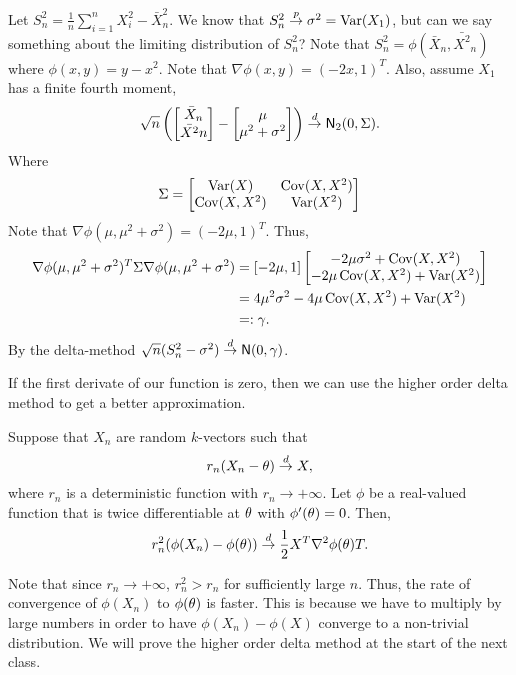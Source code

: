 \begin{example}
    Let $S_n^2 = \frac{1}{n}\sum_{i=1}^n X_i^2 - \bar{X}_n^2$. We know that $S_n^2 \stackrel{p}{\to} \sigma^2 = \operatorname{Var}(X_1)$, but can we say something about the limiting distribution of $S_n^2$? Note that $S_n^2 = \phi(\bar{X}_n, \bar{X^2}_n)$ where $\phi(x,y) = y-x^2$. Note that $\nabla \phi(x,y) = (-2x,1)^T$. Also, assume $X_1$ has a finite fourth moment,
    \[\sqrt{n}\left(\begin{bmatrix}
        \bar{X}_n\\\bar{X^2}{n}
    \end{bmatrix} - \begin{bmatrix}
        \mu \\ \mu^2+\sigma^2
    \end{bmatrix}\right)\stackrel{d}{\to} \mathsf{N}_2(0,\Sigma). \]
    Where 
    \[\Sigma = \begin{bmatrix}
        \operatorname{Var}(X)& \operatorname{Cov}(X,X^2)\\ \operatorname{Cov}(X,X^2)&\operatorname{Var}(X^2)
    \end{bmatrix} \]
    Note that $\nabla \phi(\mu,\mu^2+\sigma^2) = (-2\mu,1)^T$. Thus,
    \begin{align*}
        \nabla \phi(\mu,\mu^2+\sigma^2)^T\Sigma \nabla \phi(\mu,\mu^2+\sigma^2) &= [-2\mu,1]\begin{bmatrix}
        -2\mu\sigma^2+\operatorname{Cov}(X,X^2)\\
        -2\mu\operatorname{Cov}(X,X^2)+\operatorname{Var}(X^2)
    \end{bmatrix}\\
    & = 4\mu^2\sigma^2-4\mu\operatorname{Cov}(X,X^2)+\operatorname{Var}(X^2) \\
    &=:\gamma.
\end{align*}
By the delta-method $\sqrt{n}(S_n^2 - \sigma^2) \stackrel{d}{\to} \mathsf{N}(0,\gamma)$.
\end{example}
If the first derivate of our function is zero, then we can use the higher order delta method to get a better approximation.
\begin{theorem}
    Suppose that $X_n$ are random $k$-vectors such that 
    \[r_n(X_n-{\theta}) \stackrel{d}{\to} X, \]
    where $r_n$ is a deterministic function with $r_n \to +\infty$. Let $\phi$ be a real-valued function that is twice differentiable at ${\theta}$ with $\phi'({\theta})=0$. Then,
    \[r_n^2(\phi(X_n)-\phi({\theta})) \stackrel{d}{\to} \frac{1}{2}X^T\nabla^2\phi({\theta})T.\]
\end{theorem}
Note that since $r_n \to + \infty$, $r_n^2 > r_n$ for sufficiently large $n$. Thus, the rate of convergence of $\phi(X_n)$ to $\phi({\theta})$ is faster. This is because we have to multiply by large numbers in order to have $\phi(X_n)-\phi(X)$ converge to a non-trivial distribution. We will prove the higher order delta method at the start of the next class. 

